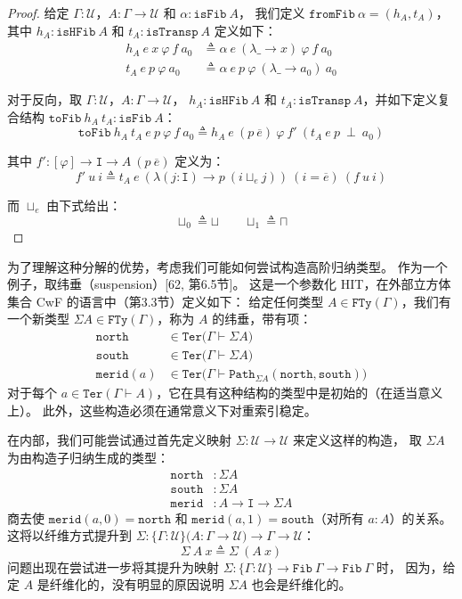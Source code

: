\documentclass{ctexrep}
\theoremstyle{plain}
\theoremstyle{definition}
\theoremstyle{remark}
\newcommand\ttI{\mathtt{I}}
\begin{document}
\begin{proof}
给定 $\Gamma : \mathcal{U}$，$A : \Gamma \to \mathcal{U}$ 和 $\alpha : \mathtt{isFib}\ A$，
我们定义 $\mathtt{fromFib}\ \alpha = (h_A, t_A)$，其中 $h_A : \mathtt{isHFib}\ A$ 和 
$t_A : \mathtt{isTransp}\ A$ 定义如下：
\[
\begin{aligned}
h_A\ e\ x\ \varphi\ f\ a_0 &\triangleq \alpha\ e\ (\lambda\_ \to x)\ \varphi\ f\ a_0 \\
t_A\ e\ p\ \varphi\ a_0 &\triangleq \alpha\ e\ p\ \varphi\ (\lambda\_ \to a_0)\ a_0
\end{aligned}
\]

对于反向，取 $\Gamma : \mathcal{U}$，$A : \Gamma \to \mathcal{U}$，
$h_A : \mathtt{isHFib}\ A$ 和 $t_A : \mathtt{isTransp}\ A$，并如下定义复合结构 
$\mathtt{toFib}\ h_A\ t_A : \mathtt{isFib}\ A$：
\[
\mathtt{toFib}\ h_A\ t_A\ e\ p\ \varphi\ f\ a_0 \triangleq h_A\ e\ (p\ \overline{e})\ \varphi\ f'\ (t_A\ e\ p\ \perp\ a_0)
\]

其中 $f' : [\varphi] \to \ttI \to A\ (p\ \overline{e})$ 定义为：
\[
f'\ u\ i \triangleq t_A\ e\ (\lambda(j : \ttI) \to p\ (i \sqcup_e j))\ (i = \overline{e})\ (f\ u\ i)
\]

而 $\sqcup_e$ 由下式给出：
\[
\sqcup_0 \triangleq \sqcup \qquad \sqcup_1 \triangleq \sqcap
\]
\end{proof}

为了理解这种分解的优势，考虑我们可能如何尝试构造高阶归纳类型。
作为一个例子，取纬垂（suspension）[62, 第6.5节]。
这是一个参数化 HIT，在外部立方体集合 CwF 的语言中（第3.3节）定义如下：
给定任何类型 $A \in \mathtt{FTy}(\Gamma)$，我们有一个新类型 
$\Sigma A \in \mathtt{FTy}(\Gamma)$，称为 $A$ 的纬垂，带有项：
\[
\begin{aligned}
\mathtt{north} &\in \mathtt{Ter}\big(\Gamma \vdash \Sigma A\big) \\
\mathtt{south} &\in \mathtt{Ter}\big(\Gamma \vdash \Sigma A\big) \\
\mathtt{merid}(a) &\in \mathtt{Ter}\big(\Gamma \vdash \mathtt{Path}_{\Sigma A}(\mathtt{north}, \mathtt{south})\big)
\end{aligned}
\]
对于每个 $a \in \mathtt{Ter}(\Gamma \vdash A)$，它在具有这种结构的类型中是初始的（在适当意义上）。
此外，这些构造必须在通常意义下对重索引稳定。

在内部，我们可能尝试通过首先定义映射 $\Sigma : \mathcal{U} \to \mathcal{U}$ 来定义这样的构造，
取 $\Sigma A$ 为由构造子归纳生成的类型：
\[
\begin{aligned}
\mathtt{north} &: \Sigma A \\
\mathtt{south} &: \Sigma A \\
\mathtt{merid} &: A \to \ttI \to \Sigma A
\end{aligned}
\]
商去使 $\mathtt{merid}(a, 0) = \mathtt{north}$ 和 $\mathtt{merid}(a, 1) = \mathtt{south}$（对所有 $a : A$）的关系。
这将以纤维方式提升到 
$\Sigma : \{\Gamma : \mathcal{U}\}\big(A : \Gamma \to \mathcal{U}\big) \to \Gamma \to \mathcal{U}$：
\[
\Sigma\ A\ x \triangleq \Sigma\ (A\ x)
\]
问题出现在尝试进一步将其提升为映射 
$\Sigma : \{\Gamma : \mathcal{U}\} \to \mathtt{Fib}\ \Gamma \to \mathtt{Fib}\ \Gamma$ 时，
因为，给定 $A$ 是纤维化的，没有明显的原因说明 $\Sigma A$ 也会是纤维化的。
\end{document}
